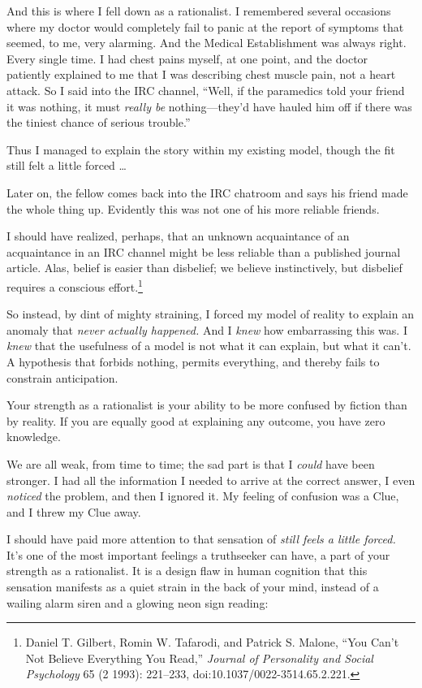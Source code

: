 {
 And this is where I fell down as a rationalist. I remembered
several occasions where my doctor would completely fail to panic at the
report of symptoms that seemed, to me, very alarming. And the Medical
Establishment was always right. Every single time. I had chest pains
myself, at one point, and the doctor patiently explained to me that I
was describing chest muscle pain, not a heart attack. So I said into
the IRC channel, ``Well, if the paramedics told your
friend it was nothing, it must \textit{really be}
nothing---they'd have hauled him off if there was the
tiniest chance of serious trouble.''}

{
 Thus I managed to explain the story within my existing model,
though the fit still felt a little forced \ldots}

{
 Later on, the fellow comes back into the IRC chatroom and says his
friend made the whole thing up. Evidently this was not one of his more
reliable friends.}

{
 I should have realized, perhaps, that an unknown acquaintance of
an acquaintance in an IRC channel might be less reliable than a
published journal article. Alas, belief is easier than disbelief; we
believe instinctively, but disbelief requires a conscious
effort.\footnote{Daniel T. Gilbert, Romin W. Tafarodi, and Patrick S. Malone,
``You Can't Not Believe Everything You
Read,'' \textit{Journal of Personality and Social
Psychology} 65 (2 1993): 221--233, doi:10.1037/0022-3514.65.2.221.}}

{
 So instead, by dint of mighty straining, I forced my model of
reality to explain an anomaly that \textit{never actually happened.}
And I \textit{knew} how embarrassing this was. I \textit{knew} that the
usefulness of a model is not what it can explain, but what it
can't. A hypothesis that forbids nothing, permits
everything, and thereby fails to constrain anticipation.}

{
 Your strength as a rationalist is your ability to be more confused
by fiction than by reality. If you are equally good at explaining any
outcome, you have zero knowledge.}

{
 We are all weak, from time to time; the sad part is that I
\textit{could} have been stronger. I had all the information I needed
to arrive at the correct answer, I even \textit{noticed} the problem,
and then I ignored it. My feeling of confusion was a Clue, and I threw
my Clue away.}

{
 I should have paid more attention to that sensation of
\textit{still feels a little forced.} It's one of the
most important feelings a truthseeker can have, a part of your strength
as a rationalist. It is a design flaw in human cognition that this
sensation manifests as a quiet strain in the back of your mind, instead
of a wailing alarm siren and a glowing neon sign reading:}


